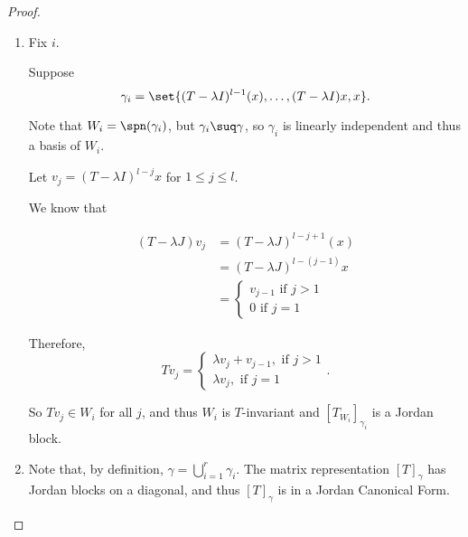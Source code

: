 \documentclass[11pt]{scrartcl}
\begin{document}
\begin{proof}
  \hfill

  \begin{enumerate}[label=\alph*)]
  \item Fix $i$.

    Suppose
    \[\gamma_i = \set{(T-\lambda I)^{l-1}(x), \dots, (T-\lambda I)x,
        x}.\]

  Note that $W_i= \spn(\gamma_i)$, but $\gamma_i\suq \gamma$, so
  $\gamma_i$ is linearly independent and thus a basis of $W_i$.

  Let $v_j = (T-\lambda I)^{l-j}x$ for $1 \leq j \leq l$.

  We know that

  \begin{align}
    (T-\lambda J)v_j &= (T-\lambda J)^{l-j+1}(x)\\
                     &= (T-\lambda J)^{l-(j-1)}x\\
                     &=
                       \begin{cases}
                         v_{j-1} \text{ if } j> 1\\
                         0 \text{ if } j=1
                       \end{cases}
  \end{align}

  Therefore,
  \begin{equation*}
    Tv_j =
    \begin{cases}
      \lambda v_j + v_{j-1}, \text{ if } j>1\\
      \lambda v_j, \text{ if } j=1
    \end{cases}.
  \end{equation*}

  So $Tv_j\in W_i$ for all $j$, and thus $W_i$ is $T$-invariant and
  $[T_{W_i}]_{\gamma_i}$ is a Jordan block.
\item Note that, by definition, $\gamma = \bigcup_{i=1}^r
  \gamma_{i}$. The matrix representation $[T]_{\gamma}$ has Jordan
  blocks on a diagonal, and thus $[T]_{\gamma}$ is in a Jordan
  Canonical Form.
\end{enumerate}
\end{proof}
\end{document}
